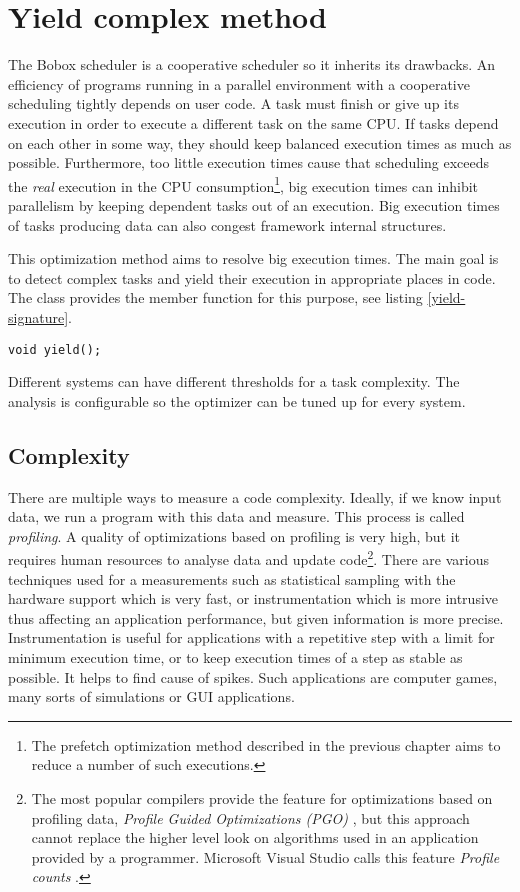 \chapter{Yield complex method}
\label{yield-intro}
The Bobox scheduler is a cooperative scheduler so it inherits its drawbacks. An efficiency of programs running in a parallel environment with a cooperative scheduling tightly depends on user code. A task must finish or give up its execution in order to execute a different task on the same CPU. If tasks depend on each other in some way, they should keep balanced execution times as much as possible. Furthermore, too little execution times cause that scheduling exceeds the \textit{real} execution in the CPU consumption\footnote{The prefetch optimization method described in the previous chapter aims to reduce a number of such executions.}, big execution times can inhibit parallelism by keeping dependent tasks out of an execution. Big execution times of tasks producing data can also congest framework internal structures.

This optimization method aims to resolve big execution times. The main goal is to detect complex tasks and yield their execution in appropriate places in code. The  class provides the member function for this purpose, see listing \ref{yield-signature}.

\begin{lstlisting}[caption={Signature of the yield execution function.}, label={yield-signature}]
void yield();
\end{lstlisting}

Different systems can have different thresholds for a task complexity. The analysis is configurable so the optimizer can be tuned up for every system.

\section{Complexity}
\label{yield-complexity}
There are multiple ways to measure a code complexity. Ideally, if we know input data, we run a program with this data and measure. This process is called \emph{profiling}. A quality of optimizations based on profiling is very high, but it requires human resources to analyse data and update code\footnote{The most popular compilers provide the feature for optimizations based on profiling data, \emph{Profile Guided Optimizations (PGO)} \cite{pgo}, but this approach cannot replace the higher level look on algorithms used in an application provided by a programmer. Microsoft Visual Studio calls this feature \emph{Profile counts} \cite{profile-counts}.}. There are various techniques used for a measurements such as statistical sampling with the hardware support which is very fast, or instrumentation which is more intrusive thus affecting an application performance, but given information is more precise. Instrumentation is useful for applications with a repetitive step with a limit for minimum execution time, or to keep execution times of a step as stable as possible. It helps to find cause of spikes. Such applications are computer games, many sorts of simulations or GUI applications.

